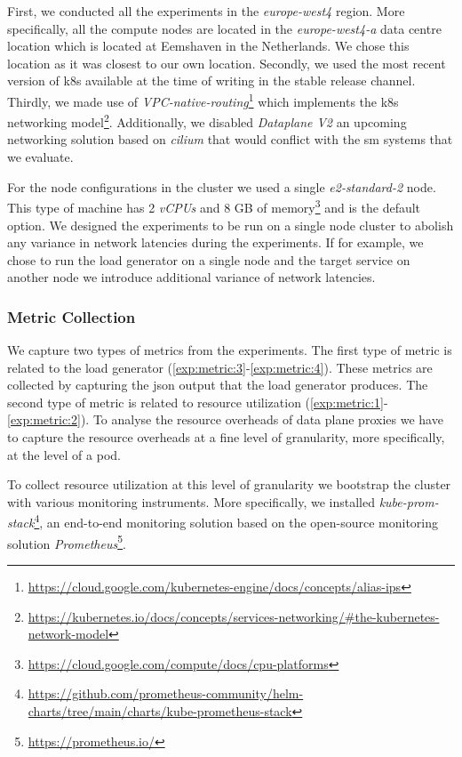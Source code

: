 First, we conducted all the experiments in the \textit{europe-west4} region. More specifically, all the compute nodes are located in the \textit{europe-west4-a} data centre location which is located at Eemshaven in the Netherlands. We chose this location as it was closest to our own location. Secondly, we used the most recent version of \gls{k8s} available at the time of writing in the stable release channel. Thirdly, we made use of \textit{VPC-native-routing}\footnote{\url{https://cloud.google.com/kubernetes-engine/docs/concepts/alias-ips}} which implements the \gls{k8s} networking model\footnote{\url{https://kubernetes.io/docs/concepts/services-networking/\#the-kubernetes-network-model}}. Additionally, we disabled \textit{Dataplane V2} an upcoming networking solution based on \textit{cilium} that would conflict with the \gls{sm} systems that we evaluate.

For the node configurations in the cluster we used a single \textit{e2-standard-2} node. This type of machine has 2 \textit{vCPUs} and 8 GB of memory\footnote{\url{https://cloud.google.com/compute/docs/cpu-platforms}} and is the default option. We designed the experiments to be run on a single node cluster to abolish any variance in network latencies during the experiments. If for example, we chose to run the load generator on a single node and the target service on another node we introduce additional variance of network latencies.



\subsubsection{Metric Collection}
\label{sec:experiments:design:environment:metric-collection}

We capture two types of metrics from the experiments. The first type of metric is related to the load generator (\ref{exp:metric:3}-\ref{exp:metric:4}). These metrics are collected by capturing the \gls{json} output that the load generator produces. The second type of metric is related to resource utilization (\ref{exp:metric:1}-\ref{exp:metric:2}). To analyse the resource overheads of data plane proxies we have to capture the resource overheads at a fine level of granularity, more specifically, at the level of a \gls{pod}.

To collect resource utilization at this level of granularity we bootstrap the cluster with various monitoring instruments. More specifically, we installed \textit{kube-prom-stack}\footnote{\url{https://github.com/prometheus-community/helm-charts/tree/main/charts/kube-prometheus-stack}}, an end-to-end monitoring solution based on the open-source monitoring solution \textit{Prometheus}\footnote{\url{https://prometheus.io/}}.


